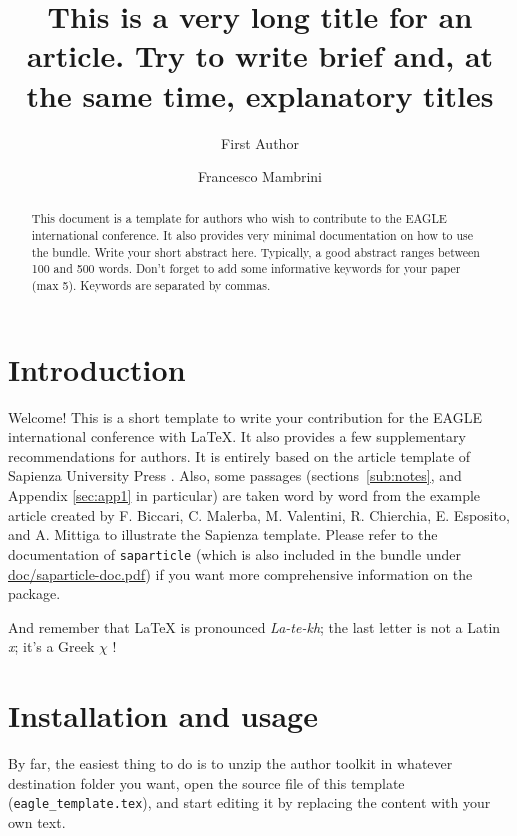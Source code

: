 \documentclass[amsthm,ebook]{saparticle}
\title{This is a very long title for an article. Try to write brief and, at the same time, explanatory titles}
\author[FENWAY]{First Author\corref{first}}
\author[DAI]{Francesco Mambrini}
\begin{document}
\maketitle

\begin{abstract}
This document is a template for authors who wish to contribute to the EAGLE international conference. It also provides very minimal documentation on how to use the bundle. Write your short abstract here. Typically, a good abstract ranges between 100 and 500 words. Don't forget to add some informative keywords for your paper (max 5). Keywords are separated by commas.
\end{abstract}


\section{Introduction}\label{sec:intro}

Welcome! This is a short template to write your contribution for the EAGLE international conference with \LaTeX. It also provides a few supplementary recommendations for authors. It is entirely based on the article template of Sapienza University Press \citep{Biccari:2012aa}. Also, some passages (sections~\ref{sub:notes}, and Appendix \ref{sec:app1} in particular) are taken word by word from the example article created by F. Biccari, C. Malerba, M. Valentini, R. Chierchia, E. Esposito, and A. Mittiga to illustrate the Sapienza template. Please refer to the documentation of \texttt{saparticle} (which is also included in the bundle under \href{run:doc/saparticle-doc.pdf}{doc/saparticle-doc.pdf}) if you want more comprehensive information on the package.

And remember that \LaTeX{} is pronounced \textit{La-te-kh}; the last letter is not a Latin \textit{x}; it's a Greek $\chi$ \citep[1]{Knuth:1986aa}!

\section{Installation and usage}\label{sec:install}

By far, the easiest thing to do is to unzip the author toolkit in whatever destination folder you want, open the source file of this template (\texttt{eagle\_template.tex}), and start editing it by replacing the content with your own text.
\end{document}
